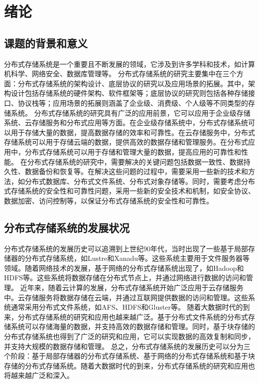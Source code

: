 \section{绪论}
  	\subsection{课题的背景和意义}
	  分布式存储系统是一个重要且不断发展的领域，它涉及到许多学科和技术，如计算机科学、网络安全、数据库管理等。
	  分布式存储系统的研究主要集中在三个方面：分布式存储系统的架构设计、底层协议的研究以及应用场景的拓展。其中，架构设计包括存储系统的硬件架构、软件框架等；底层协议的研究则包括各种存储接口、协议栈等；应用场景的拓展则涵盖了企业级、消费级、个人级等不同类型的存储系统。
	  分布式存储系统的研究具有广泛的应用前景，它可以应用于企业级存储系统、云存储服务和分布式应用等方面。在企业级存储系统中，分布式存储系统可以用于存储大量的数据，提高数据存储的效率和可靠性。在云存储服务中，分布式存储系统可以用于存储云端的数据，提供高效的数据存储和管理服务。在分布式应用中，分布式存储系统可以用于存储和管理大量的数据，提高应用的可靠性和性能。
	  在分布式存储系统的研究中，需要解决的关键问题包括数据一致性、数据持久性、数据备份和恢复等。在解决这些问题的过程中，需要采用一些新的技术和方法，如分布式数据库、分布式文件系统、分布式对象存储等。同时，需要考虑分布式存储系统的安全性和可靠性问题，采用一些新的安全技术和机制，如安全协议、数据加密、访问控制等，以保证分布式存储系统的安全性和可靠性。
	
	
	
	\subsection{分布式存储系统的发展状况}
	
	分布式存储系统的发展历史可以追溯到上世纪90年代，当时出现了一些基于局部存储器的分布式存储系统，如Lustre和Xanadu等。这些系统主要用于文件服务器等领域。随着网络技术的发展，基于网络的分布式存储系统出现了，如Hadoop和HDFS等。这些系统将数据存储在分布式节点上，并通过网络进行数据的访问和管理。
	近年来，随着云计算的发展，分布式存储系统开始广泛应用于云存储服务中。云存储服务将数据存储在云端，并通过互联网提供数据的访问和管理。这些系统通常采用分布式文件系统，如AFS、HDFS和Gluster等。
	随着大数据时代的到来，分布式存储系统的研究和应用也越来越广泛。基于分布式文件系统的分布式存储系统可以存储海量的数据，并支持高效的数据存储和管理。同时，基于块存储的分布式存储系统也得到了广泛的研究和应用，它可以实现数据的高效复制和同步，并支持大规模的数据存储和管理。
	总之，分布式存储系统的发展历史可以分为三个阶段：基于局部存储器的分布式存储系统、基于网络的分布式存储系统和基于块存储的分布式存储系统。随着大数据时代的到来，分布式存储系统的研究和应用也将越来越广泛和深入。
	
